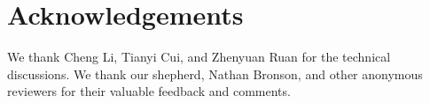 \section*{Acknowledgements}

We thank Cheng Li, Tianyi Cui, and Zhenyuan Ruan for the technical discussions.
We thank our shepherd, Nathan Bronson, and other anonymous reviewers for their valuable feedback and comments.